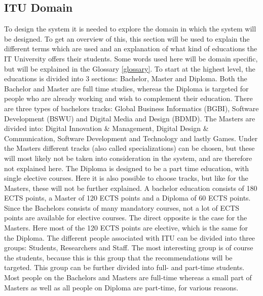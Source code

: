 \subsection{ITU Domain}
To design the system it is needed to explore the domain in which the system will be designed. To get an overview of this, this section will be used to explain the different terms which are used and an explanation of what kind of educations the IT University offers their students. Some words used here will be domain specific, but will be explained in the Glossary \ref{glossary}.
To start at the highest level, the educations is divided into 3 sections: Bachelor, Master and Diploma. Both the Bachelor and Master are full time studies, whereas the Diploma is targeted for people who are already working and wish to complement their education. There are three types of bachelors tracks: Global Business Informatics (BGBI), Software Development (BSWU) and Digital Media and Design (BDMD). The Masters are divided into: Digital Innovation \& Management, Digital Design \& Communication, Software Development and Technology and lastly Games. Under the Masters different tracks (also called specializations) can be chosen, but these will most likely not be taken into consideration in the system, and are therefore not explained here. The Diploma is designed to be a part time education, with single elective courses. Here it is also possible to choose tracks, but like for the Masters, these will not be further explained. 
A bachelor education consists of 180 ECTS points, a Master of 120 ECTS points and a Diploma of 60 ECTS points. Since the Bachelors consists of many mandatory courses, not a lot of ECTS points are available for elective courses. The direct opposite is the case for the Masters. Here most of the 120 ECTS points are elective, which is the same for the Diploma. \newline
The different people associated with ITU can be divided into three groups: Students, Researchers and Staff. The most interesting group is of course the students, because this is this group that the recommendations will be targeted. This group can be further divided into full- and part-time students. Most people on the Bachelors and Masters are full-time whereas a small part of Masters as well as all people on Diploma are part-time, for various reasons. 
